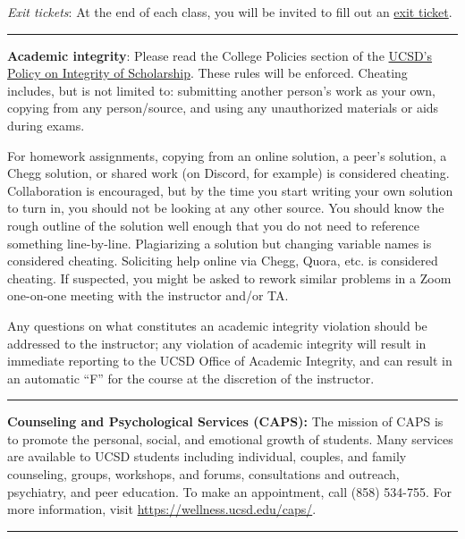 \documentclass[12pt]{article}
\begin{document}
\emph{Exit tickets}: At the end of each class, you will be invited to fill out an \href{https://forms.gle/4DmG5SjBUEM5pe6U8}{exit ticket}.

\begin{center}
	\rule{\textwidth}{0.5pt}
\end{center}

\noindent\textbf{Academic integrity}: Please read the College Policies section of the \href{http://senate.ucsd.edu/Operating-Procedures/Senate-Manual/Appendices/2}{UCSD's Policy on Integrity of Scholarship}.
These rules will be enforced.
Cheating includes, but is not limited to: submitting another person's work as your own, copying from any person/source, and using any unauthorized materials or aids during exams.

For homework assignments, copying from an online solution, a peer's solution, a Chegg solution, or shared work (on Discord, for example) is considered cheating.
Collaboration is encouraged, but by the time you start writing your own solution to turn in, you should not be looking at any other source.
You should know the rough outline of the solution well enough that you do not need to reference something line-by-line.
Plagiarizing a solution but changing variable names is considered cheating.
Soliciting help online via Chegg, Quora, etc. is considered cheating.
If suspected, you might be asked to rework similar problems in a Zoom one-on-one meeting with the instructor and/or TA.

Any questions on what constitutes an academic integrity violation should be addressed to the instructor; any violation of academic integrity will result in immediate reporting to the UCSD Office of Academic Integrity, and can result in an automatic ``F'' for the course at the discretion of the instructor.

\begin{center}
	\rule{\textwidth}{0.5pt}
\end{center}

\noindent\textbf{Counseling and Psychological Services (CAPS):} The mission of CAPS is to promote the personal, social, and emotional growth of students.
Many services are available to UCSD students including individual, couples, and family counseling, groups, workshops, and forums, consultations and outreach, psychiatry, and peer education.
To make an appointment, call (858) 534-755.
For more information, visit \href{https://wellness.ucsd.edu/caps/}{https://wellness.ucsd.edu/caps/}.

\begin{center}
	\rule{\textwidth}{0.5pt}
\end{center}
\end{document}
